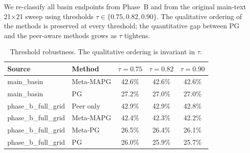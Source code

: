 We re-classify all basin endpoints from Phase~B and from the original main-text 21$\times$21 sweep using thresholds $\tau \in \{0.75, 0.82, 0.90\}$. The qualitative ordering of the methods is preserved at every threshold; the quantitative gap between PG and the peer-aware methods grows as $\tau$ tightens.

\begin{table}[h]
  \centering
\begin{tabular}{llccc}
  \toprule
  Source & Method & $\tau=0.75$ & $\tau=0.82$ & $\tau=0.90$ \\
  \midrule
  main\_basin & Meta-MAPG & 42.6\% & 42.6\% & 42.6\% \\
  main\_basin & PG & 27.2\% & 27.0\% & 27.0\% \\
  phase\_b\_full\_grid & Peer only & 42.9\% & 42.9\% & 42.8\% \\
  phase\_b\_full\_grid & Meta-MAPG & 42.4\% & 42.3\% & 42.2\% \\
  phase\_b\_full\_grid & Meta-PG & 26.5\% & 26.4\% & 26.1\% \\
  phase\_b\_full\_grid & PG & 26.0\% & 25.9\% & 25.7\% \\
  \bottomrule
\end{tabular}
  \caption{Threshold robustness. The qualitative ordering is invariant in $\tau$.}
  \label{tab:phase-f-tau}
\end{table}
